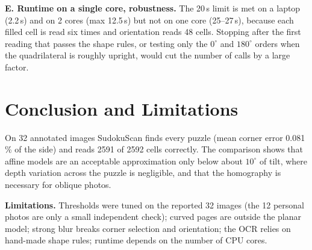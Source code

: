 \documentclass[conference]{IEEEtran}
\begin{document}
\textbf{E. Runtime on a single core, robustness.} The 20\,s limit is met on a laptop (2.2\,s) and on 2 cores (max 12.5\,s) but not on one core (25--27\,s), because each filled cell is read six times and orientation reads 48 cells. Stopping after the first reading that passes the shape rules, or testing only the $0^\circ$ and $180^\circ$ orders when the quadrilateral is roughly upright, would cut the number of calls by a large factor.

\section{Conclusion and Limitations}
On 32 annotated images SudokuScan finds every puzzle (mean corner error 0.081\,\% of the side) and reads 2591 of 2592 cells correctly. The comparison shows that affine models are an acceptable approximation only below about $10^\circ$ of tilt, where depth variation across the puzzle is negligible, and that the homography is necessary for oblique photos.

\textbf{Limitations.} Thresholds were tuned on the reported 32 images (the 12 personal photos are only a small independent check); curved pages are outside the planar model; strong blur breaks corner selection and orientation; the OCR relies on hand-made shape rules; runtime depends on the number of CPU cores.

\appendices
\end{document}
